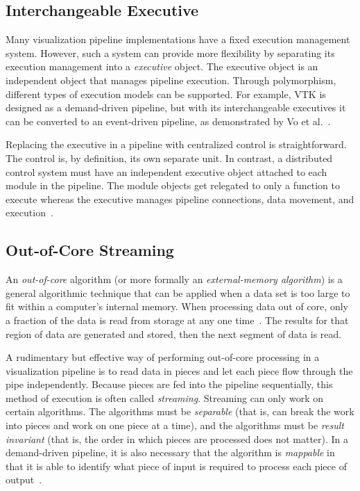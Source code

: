 \documentclass[journal,onecolumn,12pt,letterpaper,twoside]{IEEEtran}
\newcommand*{\lcite}[1]{~\cite{#1}}
\newcommand*{\scite}[1]{~\cite{#1}}
\newcommand*{\keyterm}[1]{\emph{#1}}
\newcommand{\etal}{et al.}
\begin{document}
\subsection{Interchangeable Executive}
\label{sec:InterchangeableExecutive}

Many visualization pipeline implementations have a fixed execution
management system.  However, such a system can provide more flexibility by
separating its execution management into a \keyterm{executive} object.  The
executive object is an independent object that manages pipeline execution.
Through polymorphism, different types of execution models can be
supported.  For example, VTK is designed as a demand-driven pipeline, but
with its interchangeable executives it can be converted to an event-driven
pipeline, as demonstrated by Vo \etal\scite{Vo2010}.

Replacing the executive in a pipeline with centralized control is
straightforward.  The control is, by definition, its own separate unit.  In
contrast, a distributed control system must have an independent executive
object attached to each module in the pipeline.  The module objects
get relegated to only a function to execute whereas the executive manages
pipeline connections, data movement, and execution\lcite{VTKUsersGuide}.

\subsection{Out-of-Core Streaming}
\label{sec:OutOfCore}

An \keyterm{out-of-core} algorithm (or more formally an
\keyterm{external-memory algorithm}) is a general algorithmic technique
that can be applied when a data set is too large to fit within a computer's
internal memory.  When processing data out of core, only a fraction of the
data is read from storage at any one time\lcite{Vitter2001}.  The results
for that region of data are generated and stored, then the next segment of
data is read.

A rudimentary but effective way of performing out-of-core processing in a
visualization pipeline is to read data in pieces and let each piece flow
through the pipe independently.  Because pieces are fed into the pipeline
sequentially, this method of execution is often called \keyterm{streaming}.
Streaming can only work on certain algorithms.  The algorithms must be
\keyterm{separable} (that is, can break the work into pieces and work on
one piece at a time), and the algorithms must be \keyterm{result invariant}
(that is, the order in which pieces are processed does not matter).  In a
demand-driven pipeline, it is also necessary that the algorithm is
\keyterm{mappable} in that it is able to identify what piece of input is
required to process each piece of output\lcite{Law1999}.
\end{document}
